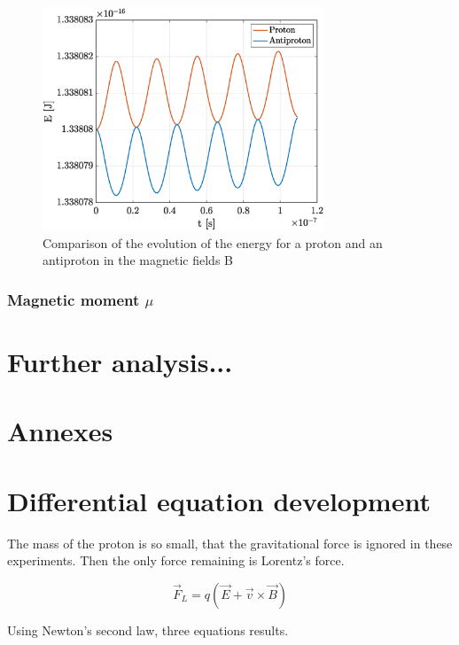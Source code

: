 \documentclass[a4paper,12pt,twoside]{article}
\begin{document}
\begin{figure}[h]
\centering
	\includegraphics[width=0.75\textwidth]{graphs/app2_i_ene.eps}	
	\caption{Comparison of the evolution of the energy for a proton and an antiproton in the magnetic fields B}
	\label{fig:app2_i_ene}
\end{figure}


\subsubsection{Magnetic moment $\mu$}

\section{Further analysis...}

\appendix
\section*{Annexes}

\section{Differential equation development} \label{ann:dev-eq-diff}
The mass of the proton is so small, that the gravitational force is ignored in these experiments.
Then the only force remaining is Lorentz's force.

\begin{equation}
	\vec{F}_L = q(\vec{E} + \vec{v}\times\vec{B})
	\label{eq:lorentz-force}
\end{equation}

Using Newton's second law, three equations results.
\end{document}
